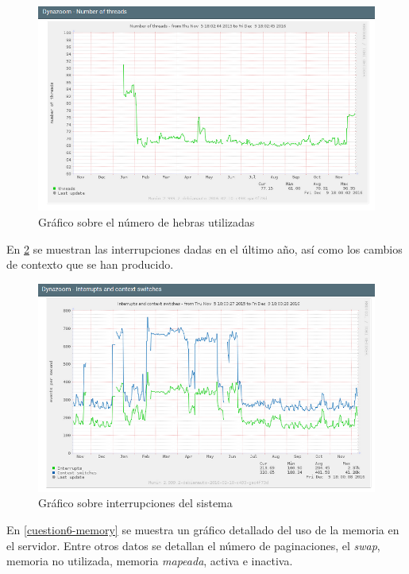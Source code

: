 \begin{figure}[H]
	\centering
	\includegraphics[scale=0.6]{cuestion6-hebras.png}
	\caption{Gráfico sobre el número de hebras utilizadas} \label{cuestion6-hebras}
\end{figure}

En \ref{cuestion6-interrupciones} se muestran las interrupciones dadas en el último año, así como los cambios de contexto que se han producido.

\begin{figure}[H]
	\centering
	\includegraphics[scale=0.6]{cuestion6-interrupciones.png}
	\caption{Gráfico sobre interrupciones del sistema} \label{cuestion6-interrupciones}
\end{figure}

En \ref{cuestion6-memory} se muestra un gráfico detallado del uso de la memoria en el servidor. Entre otros datos se detallan el número de paginaciones, el \textit{swap}, memoria no utilizada, memoria \textit{mapeada}, activa e inactiva.

